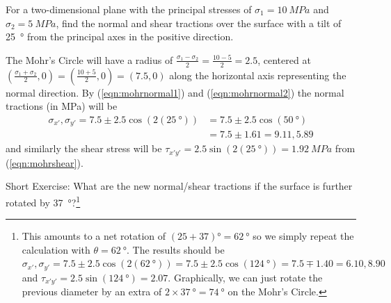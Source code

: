 \begin{exmp}
For a two-dimensional plane with the principal stresses of $\sigma_1 = \SI{10}{MPa}$ and $\sigma_2 = \SI{5}{MPa}$, find the normal and shear tractions over the surface with a tilt of \SI{25}{\degree} from the principal axes in the positive direction.
\end{exmp}
\begin{solution}
The Mohr's Circle will have a radius of $\frac{\sigma_1 - \sigma_2}{2} = \frac{10-5}{2} = 2.5$, centered at $(\frac{\sigma_1 + \sigma_2}{2}, 0) = (\frac{10 + 5}{2}, 0) = (7.5,0)$ along the horizontal axis representing the normal direction. By (\ref{eqn:mohrnormal1}) and (\ref{eqn:mohrnormal2}) the normal tractions (in \si{MPa}) will be
\begin{align*}
\sigma_{x'}, \sigma_{y'} = 7.5 \pm 2.5 \cos(2(\SI{25}{\degree})) &= 7.5 \pm 2.5 \cos(\SI{50}{\degree}) \\
&= 7.5 \pm 1.61 = 9.11, 5.89
\end{align*}
and similarly the shear stress will be $\tau_{x'y'} = 2.5\sin(2(\SI{25}{\degree})) = \SI{1.92}{MPa}$ from (\ref{eqn:mohrshear}).
\end{solution}
Short Exercise: What are the new normal/shear tractions if the surface is further rotated by \SI{37}{\degree}?\footnote{This amounts to a net rotation of $(25+37)\si{\degree}= \SI{62}{\degree}$ so we simply repeat the calculation with $\theta = \SI{62}{\degree}$. The results should be $\sigma_{x'}, \sigma_{y'} = 7.5 \pm 2.5 \cos(2(\SI{62}{\degree})) = 7.5 \pm 2.5 \cos(\SI{124}{\degree}) = 7.5 \mp 1.40 = 6.10, 8.90$ and $\tau_{x'y'} = 2.5\sin(\SI{124}{\degree}) = 2.07$. Graphically, we can just rotate the previous diameter by an extra of $2 \times \SI{37}{\degree} = \SI{74}{\degree}$ on the Mohr's Circle.}

